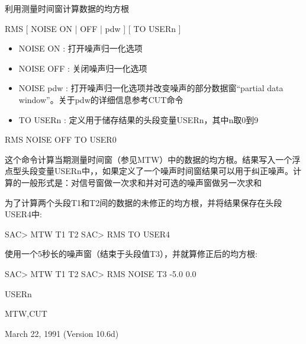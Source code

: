 \label{cmd:rms}

利用测量时间窗计算数据的均方根

RMS [ NOISE ON | OFF | pdw ] [ TO USERn ]

\begin{itemize}
\item NOISE ON : 打开噪声归一化选项  
\item NOISE OFF : 关闭噪声归一化选项  
\item NOISE pdw : 打开噪声归一化选项并改变噪声的部分数据窗``partial data window''。关于pdw的详细信息参考CUT命令 
\item TO USERn : 定义用于储存结果的头段变量USERn，其中n取0到9 
\end{itemize}

RMS NOISE OFF TO USER0

这个命令计算当期测量时间窗（参见MTW）中的数据的均方根。结果写入一个浮点型头段变量USERn中，，如果定义了一个噪声时间窗结果可以用于纠正噪声。计算的一般形式是：对信号窗做一次求和并对可选的噪声窗做另一次求和

为了计算两个头段T1和T2间的数据的未修正的均方根，并将结果保存在头段USER4中:
\begin{SACCode}
SAC> MTW T1 T2
SAC> RMS TO USER4
\end{SACCode}
使用一个5秒长的噪声窗（结束于头段值T3），并就算修正后的均方根:
\begin{SACCode}
SAC> MTW T1 T2
SAC> RMS NOISE T3 -5.0 0.0
\end{SACCode}

USERn

MTW,CUT

March 22, 1991 (Version 10.6d)

